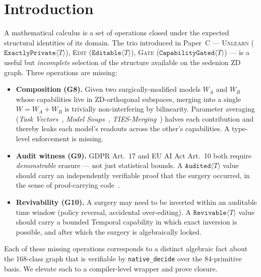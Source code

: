 \documentclass{article}
\newcommand{\ExactlyPrivate}[1]{\texttt{ExactlyPrivate}\langle #1 \rangle}
\newcommand{\Editable}[1]{\texttt{Editable}\langle #1 \rangle}
\newcommand{\CapabilityGated}[1]{\texttt{CapabilityGated}\langle #1 \rangle}
\newcommand{\Audited}[1]{\texttt{Audited}\langle #1 \rangle}
\newcommand{\Revivable}[1]{\texttt{Revivable}\langle #1 \rangle}
\begin{document}
\section{Introduction}

A mathematical calculus is a set of operations closed under the
expected structural identities of its domain.  The trio introduced
in Paper~C --- \textsc{Unlearn} ($\ExactlyPrivate{T}$),
\textsc{Edit} ($\Editable{T}$), \textsc{Gate} ($\CapabilityGated{T}$)
--- is a useful but \emph{incomplete} selection of the structure
available on the sedenion ZD graph.  Three operations are missing:

\begin{itemize}
\item \textbf{Composition (G8).}  Given two surgically-modified models
      $W_A$ and $W_B$ whose capabilities live in ZD-orthogonal
      subspaces, merging into a single $W = W_A + W_B$ is trivially
      non-interfering by bilinearity.  Parameter averaging
      (\emph{Task Vectors}~\cite{ilharco2023editing},
      \emph{Model Soups}~\cite{wortsman2022model},
      \emph{TIES-Merging}~\cite{yadav2023ties}) halves each
      contribution and thereby leaks each model's readouts across
      the other's capabilities.  A type-level enforcement is
      missing.
\item \textbf{Audit witness (G9).}  GDPR Art.~17 and EU AI Act Art.~10
      both require \emph{demonstrable} erasure --- not just statistical
      bounds.  A $\Audited{T}$ value should carry an independently
      verifiable proof that the surgery occurred, in the sense of
      proof-carrying code~\cite{necula1997proofcarrying}.
\item \textbf{Revivability (G10).}  A surgery may need to be inverted
      within an auditable time window (policy reversal, accidental
      over-editing).  A $\Revivable{T}$ value should carry a bounded
      Temporal capability in which exact inversion is possible, and
      after which the surgery is algebraically locked.
\end{itemize}

Each of these missing operations corresponds to a distinct algebraic
fact about the 168-class graph that is verifiable by
\texttt{native\_decide} over the 84-primitive basis.  We elevate each
to a compiler-level wrapper and prove closure.
\end{document}
